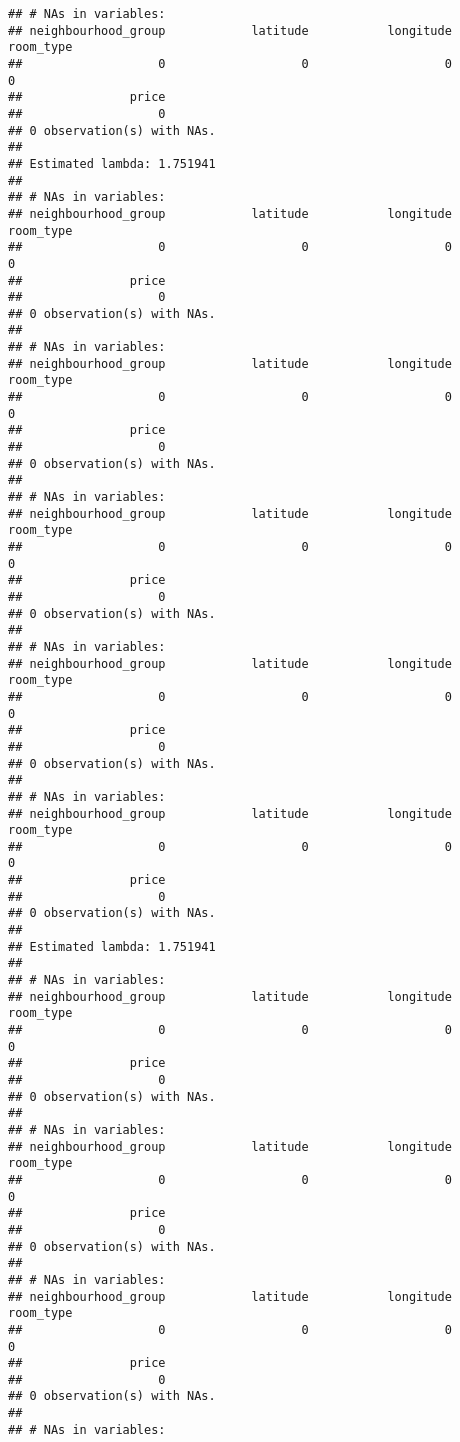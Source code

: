 \documentclass[
]{article}
\begin{document}
\begin{verbatim}
## # NAs in variables:
## neighbourhood_group            latitude           longitude           room_type 
##                   0                   0                   0                   0 
##               price 
##                   0 
## 0 observation(s) with NAs.
## 
## Estimated lambda: 1.751941 
## 
## # NAs in variables:
## neighbourhood_group            latitude           longitude           room_type 
##                   0                   0                   0                   0 
##               price 
##                   0 
## 0 observation(s) with NAs.
## 
## # NAs in variables:
## neighbourhood_group            latitude           longitude           room_type 
##                   0                   0                   0                   0 
##               price 
##                   0 
## 0 observation(s) with NAs.
## 
## # NAs in variables:
## neighbourhood_group            latitude           longitude           room_type 
##                   0                   0                   0                   0 
##               price 
##                   0 
## 0 observation(s) with NAs.
## 
## # NAs in variables:
## neighbourhood_group            latitude           longitude           room_type 
##                   0                   0                   0                   0 
##               price 
##                   0 
## 0 observation(s) with NAs.
## 
## # NAs in variables:
## neighbourhood_group            latitude           longitude           room_type 
##                   0                   0                   0                   0 
##               price 
##                   0 
## 0 observation(s) with NAs.
## 
## Estimated lambda: 1.751941 
## 
## # NAs in variables:
## neighbourhood_group            latitude           longitude           room_type 
##                   0                   0                   0                   0 
##               price 
##                   0 
## 0 observation(s) with NAs.
## 
## # NAs in variables:
## neighbourhood_group            latitude           longitude           room_type 
##                   0                   0                   0                   0 
##               price 
##                   0 
## 0 observation(s) with NAs.
## 
## # NAs in variables:
## neighbourhood_group            latitude           longitude           room_type 
##                   0                   0                   0                   0 
##               price 
##                   0 
## 0 observation(s) with NAs.
## 
## # NAs in variables:

\end{verbatim}
\end{document}
